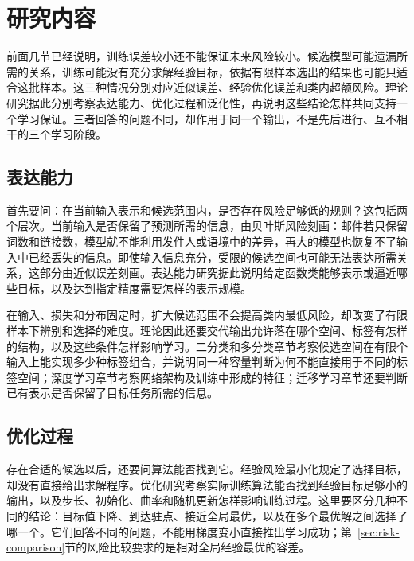 \FloatBarrier

\section{研究内容}
\label{sec:learning-theory-research-content}

前面几节已经说明，训练误差较小还不能保证未来风险较小。候选模型可能遗漏所需的关系，训练可能没有充分求解经验目标，依据有限样本选出的结果也可能只适合这批样本。这三种情况分别对应近似误差、经验优化误差和类内超额风险。理论研究据此分别考察表达能力、优化过程和泛化性，再说明这些结论怎样共同支持一个学习保证。三者回答的问题不同，却作用于同一个输出，不是先后进行、互不相干的三个学习阶段。

\subsection{表达能力}
\label{sec:research-expressivity}

首先要问：在当前输入表示和候选范围内，是否存在风险足够低的规则？这包括两个层次。当前输入是否保留了预测所需的信息，由贝叶斯风险刻画：邮件若只保留词数和链接数，模型就不能利用发件人或语境中的差异，再大的模型也恢复不了输入中已经丢失的信息。即使输入信息充分，受限的候选空间也可能无法表达所需关系，这部分由近似误差刻画。表达能力研究据此说明给定函数类能够表示或逼近哪些目标，以及达到指定精度需要怎样的表示规模。

在输入、损失和分布固定时，扩大候选范围不会提高类内最低风险，却改变了有限样本下辨别和选择的难度。理论因此还要交代输出允许落在哪个空间、标签有怎样的结构，以及这些条件怎样影响学习。二分类和多分类章节考察候选空间在有限个输入上能实现多少种标签组合，并说明同一种容量判断为何不能直接用于不同的标签空间；深度学习章节考察网络架构及训练中形成的特征；迁移学习章节还要判断已有表示是否保留了目标任务所需的信息。

\subsection{优化过程}
\label{sec:research-optimization}

存在合适的候选以后，还要问算法能否找到它。经验风险最小化规定了选择目标，却没有直接给出求解程序。优化研究考察实际训练算法能否找到经验目标足够小的输出，以及步长、初始化、曲率和随机更新怎样影响训练过程。这里要区分几种不同的结论：目标值下降、到达驻点、接近全局最优，以及在多个最优解之间选择了哪一个。它们回答不同的问题，不能用梯度变小直接推出学习成功；第~\ref{sec:risk-comparison}节的风险比较要求的是相对全局经验最优的容差。

